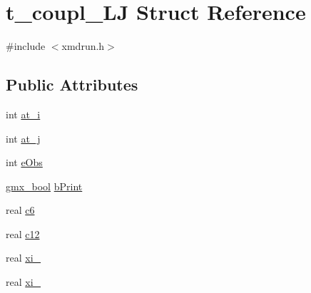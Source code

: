 \hypertarget{structt__coupl__LJ}{\section{t\-\_\-coupl\-\_\-\-L\-J \-Struct \-Reference}
\label{structt__coupl__LJ}
}


{\ttfamily \#include $<$xmdrun.\-h$>$}

\subsection*{\-Public \-Attributes}
\begin{DoxyCompactItemize}
\item 
int \hyperlink{structt__coupl__LJ_a0d27b5f93c3c6cd3b95bde3553d1dbb3}{at\-\_\-i}
\item 
int \hyperlink{structt__coupl__LJ_a84a8eada1e553224b1848f08c2dddfc6}{at\-\_\-j}
\item 
int \hyperlink{structt__coupl__LJ_a1c3bd233f03147649a0956df0c5e3523}{e\-Obs}
\item 
\hyperlink{include_2types_2simple_8h_a8fddad319f226e856400d190198d5151}{gmx\-\_\-bool} \hyperlink{structt__coupl__LJ_a69ac1dd094b4c2f3c0b5a0a058287ff3}{b\-Print}
\item 
real \hyperlink{structt__coupl__LJ_ab5d4149e9e165be3cd4f748443f4acd2}{c6}
\item 
real \hyperlink{structt__coupl__LJ_a9e7b068daf3358ea9358704e077c275c}{c12}
\item 
real \hyperlink{structt__coupl__LJ_a013a13e550e30300129d11c721c5a7e2}{xi\-\_}
\item 
real \hyperlink{structt__coupl__LJ_a75de8f863bdbd19ba65fd7fd3afa2351}{xi\-\_}
\end{DoxyCompactItemize}


